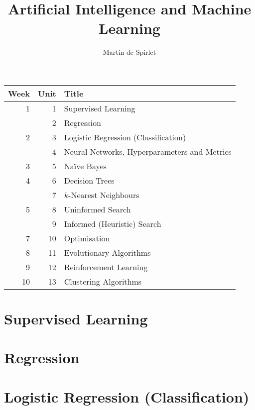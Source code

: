 \documentclass[
  11pt,
  a4paper,
]{article}
\title{Artificial Intelligence and Machine Learning}
\author{Martin de Spirlet}
\date{}
\begin{document}

\maketitle

\vspace*{\fill}

\begin{table}[htp]
  \centering
  \begin{tabular}{rrl}
    \toprule
    Week & Unit & Title \\
    \midrule
     1 &  1 & Supervised Learning \\
       &  2 & Regression \\ [1ex]
     2 &  3 & Logistic Regression (Classification) \\
       &  4 & Neural Networks, Hyperparameters and Metrics \\ [1ex]
     3 &  5 & Na\"{i}ve Bayes \\ [1ex]
     4 &  6 & Decision Trees \\
       &  7 & \( k \)-Nearest Neighbours \\ [1ex]
     5 &  8 & Uninformed Search \\
       &  9 & Informed (Heuristic) Search \\ [1ex]
     7 & 10 & Optimisation \\ [1ex]
     8 & 11 & Evolutionary Algorithms \\ [1ex]
     9 & 12 & Reinforcement Learning \\ [1ex]
    10 & 13 & Clustering Algorithms \\
    \bottomrule
  \end{tabular}
\end{table}

\vspace*{\fill}
\addvspace{1in}

\clearpage


\section{Supervised Learning}


\section{Regression}


\section{Logistic Regression (Classification)}

\end{document}
